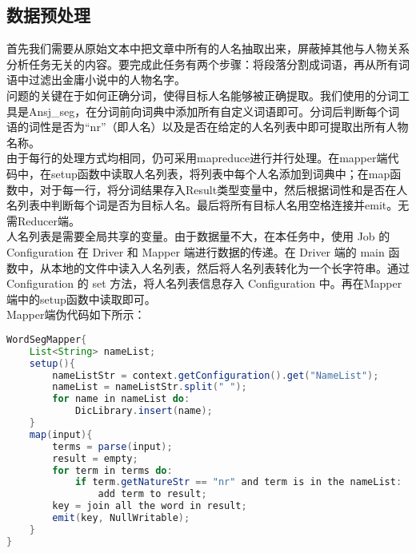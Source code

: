 \subsection{数据预处理}
首先我们需要从原始文本中把文章中所有的人名抽取出来，屏蔽掉其他与人物关系分析任务无关的内容。要完成此任务有两个步骤：将段落分割成词语，再从所有词语中过滤出金庸小说中的人物名字。\\
\indent 问题的关键在于如何正确分词，使得目标人名能够被正确提取。我们使用的分词工具是Ansj\_seg，在分词前向词典中添加所有自定义词语即可。分词后判断每个词语的词性是否为“nr”（即人名）以及是否在给定的人名列表中即可提取出所有人物名称。\\
\indent 由于每行的处理方式均相同，仍可采用mapreduce进行并行处理。在mapper端代码中，在setup函数中读取人名列表，将列表中每个人名添加到词典中；在map函数中，对于每一行，将分词结果存入Result类型变量中，然后根据词性和是否在人名列表中判断每个词是否为目标人名。最后将所有目标人名用空格连接并emit。无需Reducer端。\\
\indent 人名列表是需要全局共享的变量。由于数据量不大，在本任务中，使用 Job 的 Configuration 在 Driver 和 Mapper 端进行数据的传递。在 Driver 端的 main 函数中，从本地的文件中读入人名列表，然后将人名列表转化为一个长字符串。通过 Configuration 的 set 方法，将人名列表信息存入 Configuration 中。再在Mapper端中的setup函数中读取即可。\\
Mapper端伪代码如下所示：
\begin{lstlisting}[language=Java]
WordSegMapper{
	List<String> nameList;
	setup(){
		nameListStr = context.getConfiguration().get("NameList");
		nameList = nameListStr.split(" ");
		for name in nameList do:
			DicLibrary.insert(name);
	}
	map(input){
		terms = parse(input);
		result = empty;
		for term in terms do:
			if term.getNatureStr == "nr" and term is in the nameList:
				add term to result;
		key = join all the word in result;
		emit(key, NullWritable);
	}
}
\end{lstlisting}